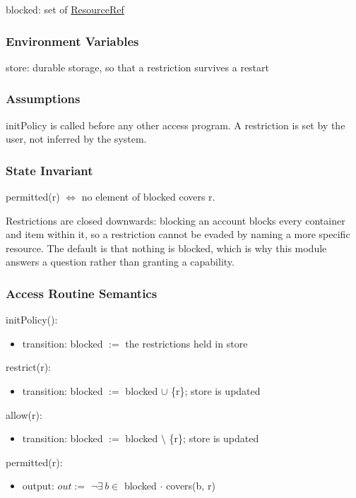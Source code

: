 \documentclass[12pt, titlepage]{article}
\begin{document}
blocked: set of \hyperref[type:ResourceRef]{ResourceRef}

\subsubsection{Environment Variables}

store: durable storage, so that a restriction survives a restart

\subsubsection{Assumptions}

initPolicy is called before any other access program. A restriction is set by
the user, not inferred by the system.

\subsubsection{State Invariant}

permitted(r) $\Leftrightarrow$ no element of blocked covers r.

\noindent Restrictions are closed downwards: blocking an account blocks every
container and item within it, so a restriction cannot be evaded by naming a more
specific resource. The default is that nothing is blocked, which is why this
module answers a question rather than granting a capability.

\subsubsection{Access Routine Semantics}

\noindent initPolicy():
\begin{itemize}
\item transition: blocked $:=$ the restrictions held in store
\end{itemize}

\noindent restrict(r):
\begin{itemize}
\item transition: blocked $:=$ blocked $\cup$ \{r\}; store is updated
\end{itemize}

\noindent allow(r):
\begin{itemize}
\item transition: blocked $:=$ blocked $\setminus$ \{r\}; store is updated
\end{itemize}

\noindent permitted(r):
\begin{itemize}
\item output: $out :=$ $\lnot \exists\, b \in$ blocked $\cdot$ covers(b, r)
\end{itemize}
\end{document}
